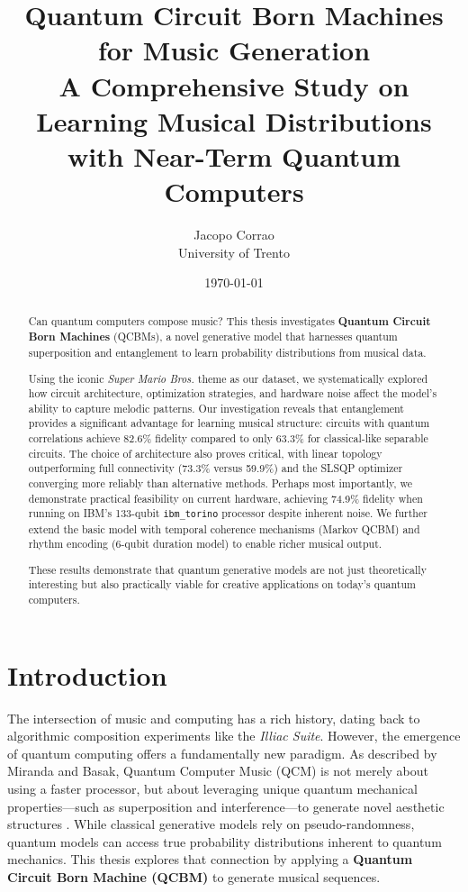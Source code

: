 \documentclass[11pt,a4paper]{article}
\title{\textbf{Quantum Circuit Born Machines for Music Generation}\\[0.5em]
\large A Comprehensive Study on Learning Musical Distributions\\with Near-Term Quantum Computers}
\author{Jacopo Corrao\\
University of Trento}
\date{\today}
\begin{document}
\maketitle

\begin{abstract}
Can quantum computers compose music? This thesis investigates \textbf{Quantum Circuit Born Machines} (QCBMs), a novel generative model that harnesses quantum superposition and entanglement to learn probability distributions from musical data.

Using the iconic \textit{Super Mario Bros.} theme as our dataset, we systematically explored how circuit architecture, optimization strategies, and hardware noise affect the model's ability to capture melodic patterns. Our investigation reveals that entanglement provides a significant advantage for learning musical structure: circuits with quantum correlations achieve 82.6\% fidelity compared to only 63.3\% for classical-like separable circuits. The choice of architecture also proves critical, with linear topology outperforming full connectivity (73.3\% versus 59.9\%) and the SLSQP optimizer converging more reliably than alternative methods. Perhaps most importantly, we demonstrate practical feasibility on current hardware, achieving 74.9\% fidelity when running on IBM's 133-qubit \texttt{ibm\_torino} processor despite inherent noise. We further extend the basic model with temporal coherence mechanisms (Markov QCBM) and rhythm encoding (6-qubit duration model) to enable richer musical output.

These results demonstrate that quantum generative models are not just theoretically interesting but also practically viable for creative applications on today's quantum computers.
\end{abstract}

\tableofcontents
\newpage

\section{Introduction}

The intersection of music and computing has a rich history, dating back to algorithmic composition experiments like the \textit{Illiac Suite}. However, the emergence of quantum computing offers a fundamentally new paradigm. As described by Miranda and Basak, Quantum Computer Music (QCM) is not merely about using a faster processor, but about leveraging unique quantum mechanical properties—such as superposition and interference—to generate novel aesthetic structures \cite{Miranda2021}. While classical generative models rely on pseudo-randomness, quantum models can access true probability distributions inherent to quantum mechanics. This thesis explores that connection by applying a \textbf{Quantum Circuit Born Machine (QCBM)} to generate musical sequences.
\end{document}
